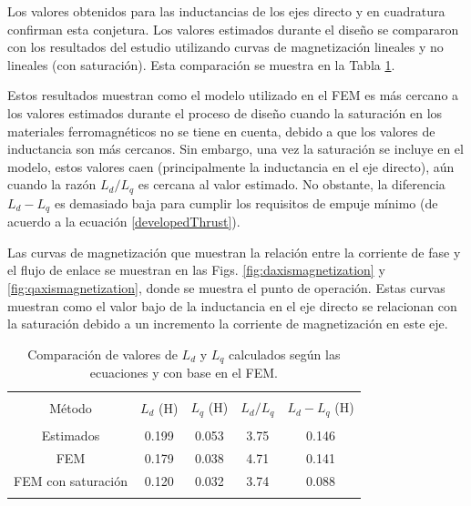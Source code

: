 Los valores obtenidos para las inductancias de los ejes directo y en cuadratura confirman esta conjetura. Los valores estimados durante el diseño se compararon con los resultados del estudio utilizando curvas de magnetización lineales y no lineales (con saturación). Esta comparación se muestra en la Tabla \ref{table:inductanceresults}.

Estos resultados muestran como el modelo utilizado en el FEM es más cercano a los valores estimados durante el proceso de diseño cuando la saturación en los materiales ferromagnéticos no se tiene en cuenta, debido a que los valores de inductancia son más cercanos. Sin embargo, una vez la saturación se incluye en el modelo, estos valores caen (principalmente la inductancia en el eje directo), aún cuando la razón $L_d/L_q$ es cercana al valor estimado. No obstante, la diferencia $L_d-L_q$ es demasiado baja para cumplir los requisitos de empuje mínimo (de acuerdo a la ecuación \ref{developedThrust}).

Las curvas de magnetización que muestran la relación entre la corriente de fase y el flujo de enlace se muestran en las Figs. \ref{fig:daxismagnetization} y \ref{fig:qaxismagnetization}, donde se muestra el punto de operación. Estas curvas muestran como el valor bajo de la inductancia en el eje directo se relacionan con la saturación debido a un incremento la corriente de magnetización en este eje.

\begin{table}[t]
\centering
\caption{Comparación de valores de $L_d$ y $L_q$ calculados según las ecuaciones y con base en el FEM.}
\label{table:inductanceresults}
\begin{tabular}{c c c c c}
\hline\hline\\
Método & $L_d$ (H) & $L_q$ (H) & $L_d/L_q$ & $L_d-L_q$ (H)\\
\hline\\
Estimados & 0.199 & 0.053 & 3.75 & 0.146\\
FEM & 0.179 & 0.038 & 4.71 & 0.141\\
FEM con saturación & 0.120 & 0.032 & 3.74 & 0.088\\
\hline\hline\\
\end{tabular}
\end{table}

